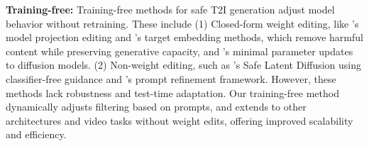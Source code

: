 {\bf Training-free:} Training-free methods for safe T2I generation adjust model behavior without retraining. These include (1) Closed-form weight editing, like \citet{gandikota2024unified}'s model projection editing and \citet{gong2024reliable}'s target embedding methods, which remove harmful content while preserving generative capacity, and \citet{orgad2023editing}'s minimal parameter updates to diffusion models. (2) Non-weight editing, such as \citet{schramowski2023safe}'s Safe Latent Diffusion using classifier-free guidance and \citet{cai2024ethical}'s prompt refinement framework. However, these methods lack robustness and test-time adaptation. Our training-free method dynamically adjusts filtering based on prompts, and extends to other architectures and video tasks without weight edits, offering improved scalability and efficiency.


























